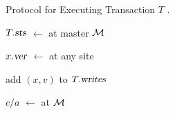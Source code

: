 \setcounter{algorithm}{0}
\begin{algorithm}[H]
  \caption{\rvsims{} Protocol for Executing Transaction $T$ .}
  \begin{algorithmic}[1]
    \State $T.\textsl{sts}$ $\gets$   at master 
    $\mathcal{M}$   \label{line:call-start}
    \EndProcedure

      \State $x.\textsl{ver}$ $\gets$   at any site
    \EndProcedure

      \State add $(x, v)$ to $T.\textsl{writes}$ \label{line:write-at-client}
    \EndProcedure

    \State {} \label{line:call-add-vc}
    \State $c/a$ $\gets$   at $\mathcal{M}$ \label{line:call-commit}
    \EndProcedure
  \end{algorithmic}
\end{algorithm}
